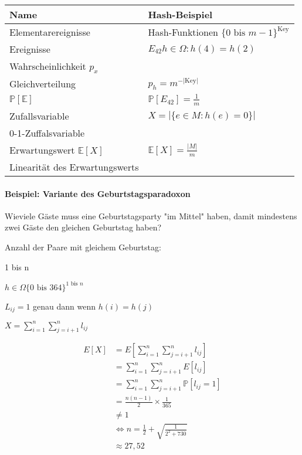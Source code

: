 \documentclass[a4paper]{scrartcl}
\begin{document}
	\begin{table}[H]
		\centering
		\begin{tabular}{|l|l|}
			\hline
			Name & Hash-Beispiel\\ 
			\hline
			Elementarereignisse & Hash-Funktionen \( \{ 0 \text{ bis } m-1 \}^{\text{Key}} \)  \\
			Ereignisse & \( E_{42} {h \in \Omega : h(4) = h(2) } \)  \\
			Wahrscheinlichkeit \(p_x\) & \\
			Gleichverteilung & \( p_h = m^{- |\text{Key}|} \) \\
			\( \mathbb{P} [\mathbb{E}]\)& \( \mathbb{P} [E_{42}] = \frac{1}{m} \) \\
			Zufallsvariable & \( X = | \{ e \in M : h(e) =0 \} | \) \\
			0-1-Zuffalsvariable & \\
			Erwartungswert \( \mathbb{ E } [X] \)& \( \mathbb{E} [X] = \frac{|M|}{m} \) \\
			Linearität des Erwartungswerts& \\ \hline
		\end{tabular}
	\end{table}
	
	\paragraph{Beispiel: Variante des Geburtstagsparadoxon}
	Wieviele Gäste muss eine Geburtstagsparty "im Mittel" haben, damit mindestens zwei Gäste den gleichen Geburtstag haben?\\
	\begin{labeling}{Anzahl der Paare mit gleichem Geburtstag:}
		\item[\emph{Gäste (Keys):}] 1 bis n
		\item[\emph{Elementarereignisse:}]  \( h \in \Omega \{0 \text{ bis } 364 \}^{1 \text{ bis } n} \)
		\item[\emph{Definiere Zufallsvariable/ Indikator-ZV:}]  \( L_{ij} =1 \) genau dann wenn \( h(i) = h(j) \)
		\item[\emph{Anzahl der Paare mit gleichem Geburtstag:}]  \( X = \sum_{i=1}^{n} \sum_{j=i+1}^{n} l_{ij} \)
	\end{labeling}
	\begin{align}
		E[X] &= E[ \sum_{i=1}^{n} \sum_{j=i+1}^{n} l_{ij} ] \\
		&= \sum_{i=1}^{n} \sum_{j=i+1}^{n} E[ l_{ij} ] \\
		&= \sum_{i=1}^{n} \sum_{j=i+1}^{n} \mathbb{P} [l_{ij} = 1]\\
		&= \frac{n(n-1)}{2} \times \frac{1}{365}\\
		&\neq 1 \\
		& \iff n = \frac{1}{2} + \sqrt{\frac{1}{2^2 + 730 }}\\
		& \approx 27,52
	\end{align}
	
\end{document}
